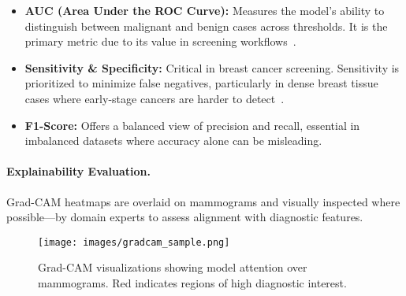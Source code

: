 \documentclass[12pt]{article}
\begin{document}
\begin{itemize}
    \item \textbf{AUC (Area Under the ROC Curve):} Measures the model’s ability to distinguish between malignant and benign cases across thresholds. It is the primary metric due to its value in screening workflows~\cite{1}.
    
    \item \textbf{Sensitivity \& Specificity:} Critical in breast cancer screening. Sensitivity is prioritized to minimize false negatives, particularly in dense breast tissue cases where early-stage cancers are harder to detect~\cite{6}.
    
    \item \textbf{F1-Score:} Offers a balanced view of precision and recall, essential in imbalanced datasets where accuracy alone can be misleading.
\end{itemize}

\paragraph{Explainability Evaluation.}
Grad-CAM heatmaps are overlaid on mammograms and visually inspected where possible—by domain experts to assess alignment with diagnostic features.

\begin{figure}[H]
    \centering
    \texttt{[image: images/gradcam\_sample.png]}
    \caption{Grad-CAM visualizations showing model attention over mammograms. Red indicates regions of high diagnostic interest.}
\end{figure}


\end{document}
